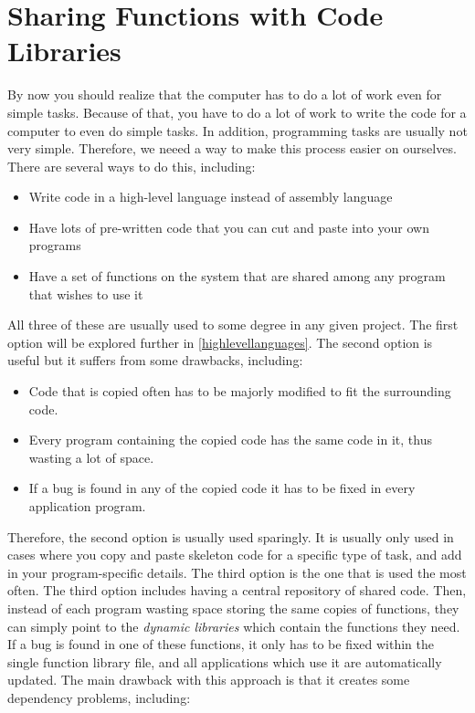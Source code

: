 \chapter{Sharing Functions with Code Libraries}
\label{linking}

% 
% 
% 
% 

By now you should realize that the computer has to do a lot
of work even for simple tasks.  Because of that, you have to
do a lot of work to write the code for a computer to even do
simple tasks.  In addition, programming tasks are usually not
very simple.  Therefore, we neeed a way to make this process
easier on ourselves.  There are several ways to do this, including:

\begin{itemize}\item Write code in a high-level language instead of assembly language 
\item Have lots of pre-written code that you can cut and paste into your own programs 
\item Have a set of functions on the system that are shared among any program that wishes to use it 
\end{itemize}

All three of these are usually used to some degree in any given project.  The 
first option
will be explored further in \autoref{highlevellanguages}.  The
second option is useful but it suffers from some drawbacks, including:

\begin{itemize}\item Code that is copied often has to be majorly modified to fit the surrounding code. 
\item Every program containing the copied code has the same code in it, thus wasting a lot of space. 
\item If a bug is found in any of the copied code it has to be fixed in every application program. 
\end{itemize}

Therefore, the second option is usually used sparingly.  It is  usually 
only used in cases where you copy and paste skeleton code 
for a specific type of task, and add in your program-specific
details.  The third option is the one that is used the most often.  The third option includes having a central repository of shared code.  Then, instead of each program wasting
space storing the same copies of functions, they can simply point to the
\emph{dynamic libraries}  
which contain the functions they need.  If a bug is found in
one of these functions, it only has to be fixed within the single function library 
file, and all applications which use it are automatically updated.  The 
main drawback with this approach is that it creates some dependency problems,
including:

